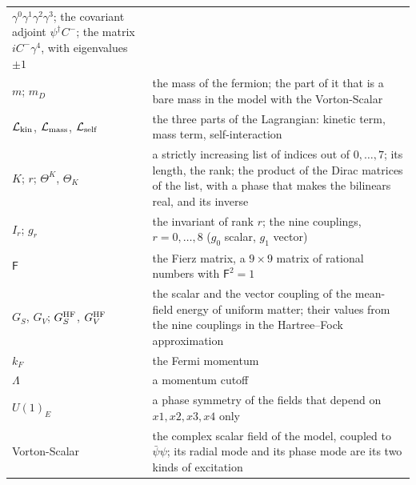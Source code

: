\documentclass[
  10pt,
]{article}
\begin{document}
\begin{longtable}[]{@{}
  >{\raggedright\arraybackslash}p{}
  >{\raggedright\arraybackslash}p{}@{}}
\(\gamma^0\gamma^1\gamma^2\gamma^3\); the covariant adjoint
\(\psi^\dagger C^-\); the matrix \(iC^-\gamma^4\), with eigenvalues
\(\pm1\) \\
\(m\); \(m_D\) & the mass of the fermion; the part of it that is a bare
mass in the model with the Vorton-Scalar \\
\(\mathcal L_{\rm kin}\), \(\mathcal L_{\rm mass}\),
\(\mathcal L_{\rm self}\) & the three parts of the Lagrangian: kinetic
term, mass term, self-interaction \\
\(K\); \(r\); \(\Theta^K\), \(\Theta_K\) & a strictly increasing list of
indices out of \(0,\dots,7\); its length, the rank; the product of the
Dirac matrices of the list, with a phase that makes the bilinears real,
and its inverse \\
\(I_r\); \(g_r\) & the invariant of rank \(r\); the nine couplings,
\(r=0,\dots,8\) (\(g_0\) scalar, \(g_1\) vector) \\
\(\mathsf F\) & the Fierz matrix, a \(9\times9\) matrix of rational
numbers with \(\mathsf F^2=1\) \\
\(G_S\), \(G_V\); \(G_S^{\rm HF}\), \(G_V^{\rm HF}\) & the scalar and
the vector coupling of the mean-field energy of uniform matter; their
values from the nine couplings in the Hartree--Fock approximation \\
\(k_F\) & the Fermi momentum \\
\(\Lambda\) & a momentum cutoff \\
\(U(1)_E\) & a phase symmetry of the fields that depend on
\(x1,x2,x3,x4\) only \\
Vorton-Scalar & the complex scalar field of the model, coupled to
\(\bar\psi\psi\); its radial mode and its phase mode are its two kinds
of excitation \\
\end{longtable}
\end{document}
